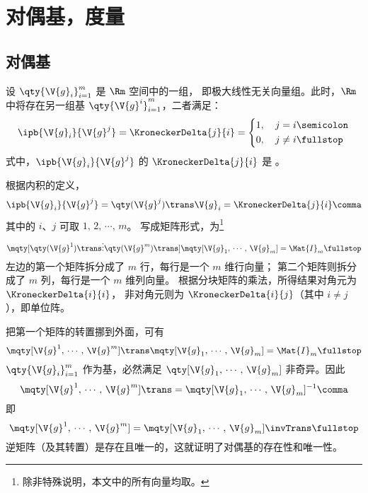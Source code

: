 \section{对偶基，度量}
\subsection{对偶基} \label{subsec:对偶基}
设 $\qty{\V{g}_i}^m_{i=1}$ 是 $\Rm$ 空间中的一组，
即极大线性无关向量组。此时，$\Rm$ 中将存在另一组基
$\qty{\V{g}^i}^m_{i=1}$，二者满足：
\begin{equation}
	\ipb{\V{g}_i}{\V{g}^j}=\KroneckerDelta{j}{i}
	=\left\{\begin{aligned}
		1,\quad j&=i \semicolon\\
		0,\quad j&\neq i \fullstop
	\end{aligned}\right.
	\label{eq:对偶关系}
\end{equation}
式中，$\ipb{\V{g}_i}{\V{g}^j}$ 的 $\KroneckerDelta{j}{i}$ 是 
。

\begin{myProof}
根据内积的定义，
\begin{equation}
	\ipb{\V{g}_i}{\V{g}^j}=\qty(\V{g}^j)\trans\V{g}_i
	=\KroneckerDelta{j}{i} \comma
\end{equation}
其中的 $i$、$j$ 可取 $1,\,2,\,\cdots,\,m$。
写成矩阵形式，为\footnote{
	除非特殊说明，本文中的所有向量均取。}
\begin{equation}
	\mqty[\qty(\V{g}^1)\trans \\ \vdots \\ \qty(\V{g}^m)\trans]
	\mqty[\V{g}_1,\,\cdots,\,\V{g}_m] = \Mat{I}_m \fullstop
\end{equation}
左边的第一个矩阵拆分成了 $m$ 行，每行是一个 $m$ 维行向量；
第二个矩阵则拆分成了 $m$ 列，每行是一个 $m$ 维列向量。
根据分块矩阵的乘法，所得结果对角元为 $\KroneckerDelta{i}{i}$，
非对角元则为 $\KroneckerDelta{i}{j}$（其中 $i\neq j$），即单位阵。

把第一个矩阵的转置挪到外面，可有
\begin{equation}
	\mqty[\V{g}^1,\,\cdots,\,\V{g}^m]\trans
	\mqty[\V{g}_1,\,\cdots,\,\V{g}_m] = \Mat{I}_m \fullstop
\end{equation}
$\qty{\V{g}_i}^m_{i=1}$ 作为基，必然满足
$\qty[\V{g}_1,\,\cdots,\,\V{g}_m]$ 非奇异。因此
\begin{equation}
	\mqty[\V{g}^1,\,\cdots,\,\V{g}^m]\trans
	=\mqty[\V{g}_1,\,\cdots,\,\V{g}_m]^{-1} \comma
\end{equation}
即
\begin{equation}
	\mqty[\V{g}^1,\,\cdots,\,\V{g}^m]
	=\mqty[\V{g}_1,\,\cdots,\,\V{g}_m]\invTrans \fullstop
	\label{eq:逆变基用协变基表示}
\end{equation}
逆矩阵（及其转置）是存在且唯一的，这就证明了对偶基的存在性和唯一性。
\end{myProof}

